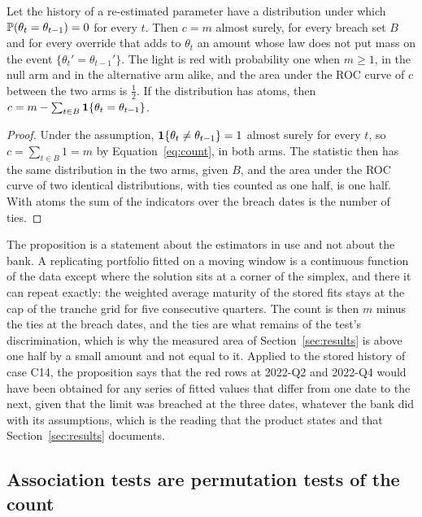 \begin{proposition}[Degeneracy]
\label{prop:degeneracy}
Let the history of a re-estimated parameter have a distribution under which $\mathbb{P}(\theta_t=\theta_{t-1})=0$ for every $t$. Then $c=m$ almost surely, for every breach set $B$ and for every override that adds to $\theta_t$ an amount whose law does not put mass on the event $\{\theta_t'=\theta_{t-1}'\}$. The light is red with probability one when $m\ge 1$, in the null arm and in the alternative arm alike, and the area under the ROC curve of $c$ between the two arms is $\tfrac12$. If the distribution has atoms, then $c=m-\sum_{t\in B}\mathbf{1}\{\theta_t=\theta_{t-1}\}$.
\end{proposition}
\begin{proof}
Under the assumption, $\mathbf{1}\{\theta_t\ne\theta_{t-1}\}=1$ almost surely for every $t$, so $c=\sum_{t\in B}1=m$ by Equation~\eqref{eq:count}, in both arms. The statistic then has the same distribution in the two arms, given $B$, and the area under the ROC curve of two identical distributions, with ties counted as one half, is one half. With atoms the sum of the indicators over the breach dates is the number of ties.
\end{proof}
The proposition is a statement about the estimators in use and not about the bank. A replicating portfolio fitted on a moving window is a continuous function of the data except where the solution sits at a corner of the simplex, and there it can repeat exactly: the weighted average maturity of the stored fits stays at the cap of the tranche grid for five consecutive quarters. The count is then $m$ minus the ties at the breach dates, and the ties are what remains of the test's discrimination, which is why the measured area of Section~\ref{sec:results} is above one half by a small amount and not equal to it. Applied to the stored history of case C14, the proposition says that the red rows at 2022-Q2 and 2022-Q4 would have been obtained for any series of fitted values that differ from one date to the next, given that the limit was breached at the three dates, whatever the bank did with its assumptions, which is the reading that the product states and that Section~\ref{sec:results} documents.

\subsection{Association tests are permutation tests of the count}
\label{sec:theory-association}

